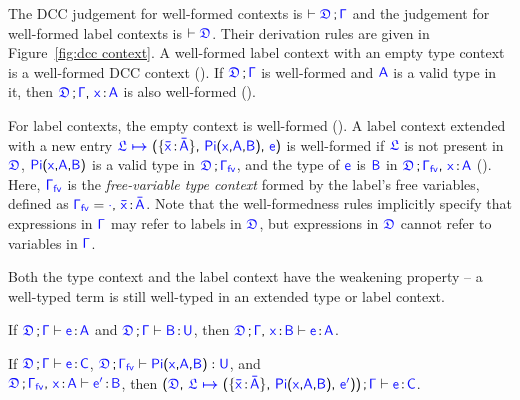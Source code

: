 The DCC judgement for well-formed contexts is $\vdash \targetcon$ and the judgement for well-formed label contexts is $\vdash \target{\fdef}$. Their derivation rules are given in Figure~\ref{fig:dcc context}. A well-formed label context with an empty type context is a well-formed DCC context (). 
If $\targetcon$ is well-formed and $\target{A}$ is a valid type in it, then $\target{\fdef} \semicolon \target{\Gamma} \sfcomma \itemtype{x}{A}$ is also well-formed (). 

For label contexts, the empty context is well-formed (). A label context extended with a new entry $\itemdef{\target{\flabel}}{\itemtype{\bar{x}}{\bar{A}}}{\targetpi{x}{A}{B}}{\target{e}}$ is well-formed if $\target{\flabel}$ is not present in $\target{\fdef}$, $\targetpi{x}{A}{B}$ is a valid type in $\target{\fdef} \semicolon \target{\Gamma_{fv}}$, and the type of $\target{e}$ is $\target{B}$ in $\target{\fdef} \semicolon \target{\Gamma_{fv}} \sfcomma \itemtype{x}{A}$ (). Here, $\target{\Gamma_{fv}}$ is the \textit{free-variable type context} formed by the label's free variables, defined as $\target{\Gamma_{fv}} = \target{\cdot} \sfcomma \itemtype{\bar{x}}{\bar{A}}$. Note that the well-formedness rules implicitly specify that expressions in $\target{\Gamma}$ may refer to labels in $\target{\fdef}$, but expressions in $\target{\fdef}$ cannot refer to variables in $\target{\Gamma}$. 

Both the type context and the label context have the weakening property -- a well-typed term is still well-typed in an extended type or label context. 

\begin{lemma} If $\targetcon \vdash \itemtype{e}{A}$ and $\targetcon \vdash \itemtype{B}{U}$, then $\targetcon \sfcomma \itemtype{x}{B} \vdash \itemtype{e}{A}$.
\end{lemma}

\begin{lemma} If $\targetcon \vdash \itemtype{e}{C}$,
$\target{\fdef}\semicolon \target{\Gamma_{fv}} \vdash \targetpi{x}{A}{B} \mathrel{:} \target{U}$, and\\
$\target{\fdef}\semicolon \target{\Gamma_{fv}}\sfcomma \itemtype{x}{A} \vdash \itemtype{e'}{B}$, then
$\sfpl \target{\fdef}\sfcomma \itemdef{\target{\flabel}}{\itemtype{\bar{x}}{\bar{A}}}{\targetpi{x}{A}{B}}{\target{e'}} \sfpr 
\semicolon \target{\Gamma} \vdash \itemtype{e}{C}
$.
\end{lemma}

